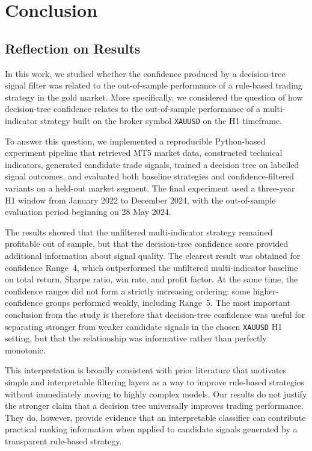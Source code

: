 \chapter{Conclusion}
\label{chapter:Conclusion}

\section{Reflection on Results}

In this work, we studied whether the confidence produced by a decision-tree
signal filter was related to the out-of-sample performance of a rule-based
trading strategy in the gold market. More specifically, we considered the
question of how decision-tree confidence relates to the out-of-sample
performance of a multi-indicator strategy built on the broker symbol
\texttt{XAUUSD} on the H1 timeframe.

To answer this question, we implemented a reproducible Python-based experiment
pipeline that retrieved MT5 market data, constructed technical indicators,
generated candidate trade signals, trained a decision tree on labelled signal
outcomes, and evaluated both baseline strategies and confidence-filtered
variants on a held-out market segment. The final experiment used a three-year
H1 window from January 2022 to December 2024, with the out-of-sample
evaluation period beginning on 28 May 2024.

The results showed that the unfiltered multi-indicator strategy remained
profitable out of sample, but that the decision-tree confidence score provided
additional information about signal quality. The clearest result was obtained
for confidence Range~4, which outperformed the unfiltered multi-indicator
baseline on total return, Sharpe ratio, win rate, and profit factor. At the
same time, the confidence ranges did not form a strictly increasing ordering:
some higher-confidence groups performed weakly, including Range~5. The most
important conclusion from the study is therefore that decision-tree confidence
was useful for separating stronger from weaker candidate signals in the chosen
\texttt{XAUUSD} H1 setting, but that the relationship was informative rather
than perfectly monotonic.

This interpretation is broadly consistent with prior literature that motivates
simple and interpretable filtering layers as a way to improve rule-based
strategies without immediately moving to highly complex models. Our results do
not justify the stronger claim that a decision tree universally improves
trading performance. They do, however, provide evidence that an interpretable
classifier can contribute practical ranking information when applied to
candidate signals generated by a transparent rule-based strategy.

